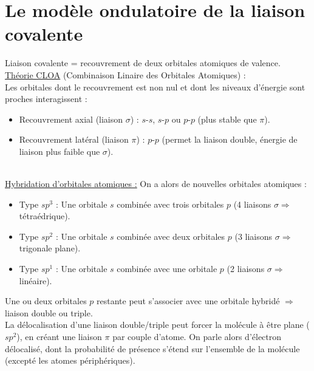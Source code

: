 \documentclass[13pt, twoside, a4paper, french, tikz]{report}
\begin{document}
  
  \section{Le modèle ondulatoire de la liaison covalente}\label{sec:le-modele-ondulatoire-de-la-liaison-covalente}
    
    Liaison covalente = recouvrement de deux orbitales atomiques de valence.\\
    
    \underline{Théorie CLOA} (Combinaison Linaire des Orbitales Atomiques) :\\
    
    Les orbitales dont le recouvrement est non nul et dont les niveaux d'énergie sont proches interagissent :
    \begin{itemize}
      \item Recouvrement axial (liaison $\sigma$) : $s$-$s$, $s$-$p$ ou $p$-$p$ (plus stable que $\pi$).
      \item Recouvrement latéral (liaison $\pi$) : $p$-$p$ (permet la liaison double, énergie de liaison plus faible que $\sigma$).
    \end{itemize}
    \ \\
    \underline{Hybridation d'orbitales atomiques :} On a alors de nouvelles orbitales atomiques :
    \begin{itemize}
      \item Type $sp^3$ : Une orbitale $s$ combinée avec trois orbitales $p$ (4 liaisons $\sigma \Rightarrow$ tétraédrique).
      \item Type $sp^2$ : Une orbitale $s$ combinée avec deux orbitales $p$ (3 liaisons $\sigma \Rightarrow$ trigonale plane).
      \item Type $sp^1$ : Une orbitale $s$ combinée avec une orbitale $p$ (2 liaisons $\sigma \Rightarrow$ linéaire).
    \end{itemize}
    Une ou deux orbitales $p$ restante peut s'associer avec une orbitale hybridé $\Rightarrow$ liaison double ou triple.\\
    
    La délocalisation d'une liaison double/triple peut forcer la molécule à être plane ($sp^2$), en créant une liaison $\pi$ par couple d'atome.
    On parle alors d'électron délocalisé, dont la probabilité de présence s'étend sur l'ensemble de la molécule (excepté les atomes périphériques).
\end{document}
